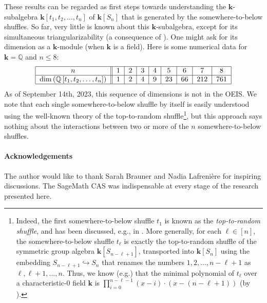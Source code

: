 \documentclass[numbers=enddot,12pt,final,onecolumn,notitlepage]{scrartcl}%
\theoremstyle{definition}
\let\prodnonlimits\prod
\renewcommand{\prod}{\prodnonlimits\limits}
\begin{document}
These results can be regarded as first steps towards understanding the
$\mathbf{k}$-subalgebra $\mathbf{k}\left[  t_{1},t_{2},\ldots,t_{n}\right]  $
of $\mathbf{k}\left[  S_{n}\right]  $ that is generated by the
somewhere-to-below shuffles. So far, very little is known about this
$\mathbf{k}$-subalgebra, except for its simultaneous triangularizability (a
consequence of \cite[Theorem 4.1]{s2b1}). One might ask for its dimension as a
$\mathbf{k}$-module (when $\mathbf{k}$ is a field). Here is some numerical
data for $\mathbf{k}=\mathbb{Q}$ and $n\leq8$:
\begin{equation}%
\begin{tabular}
[c]{|c||c|c|c|c|c|c|c|c|}\hline
$n$ & $1$ & $2$ & $3$ & $4$ & $5$ & $6$ & $7$ & $8$\\\hline
$\dim\left(  \mathbb{Q}\left[  t_{1},t_{2},\ldots,t_{n}\right]  \right)  $ &
$1$ & $2$ & $4$ & $9$ & $23$ & $66$ & $212$ & $761$\\\hline
\end{tabular}
\label{eq.dimQ}%
\end{equation}
As of September 14th, 2023, this sequence of dimensions is not in the OEIS. We
note that each single somewhere-to-below shuffle by itself is easily
understood using the well-known theory of the top-to-random
shuffle\footnote{Indeed, the first somewhere-to-below shuffle $t_{1}$ is known
as the \emph{top-to-random shuffle}, and has been discussed, e.g., in
\cite{Hendri72, Donnel91, Phatar91, Fill96, BiHaRo99, DiFiPi92, Palmes10,
Grinbe18}. More generally, for each $\ell\in\left[  n\right]  $, the
somewhere-to-below shuffle $t_{\ell}$ is exactly the top-to-random shuffle of
the symmetric group algebra $\mathbf{k}\left[  S_{n-\ell+1}\right]  $,
transported into $\mathbf{k}\left[  S_{n}\right]  $ using the embedding
$S_{n-\ell+1}\hookrightarrow S_{n}$ that renames the numbers $1,2,\ldots
,n-\ell+1$ as $\ell,\ell+1,\ldots,n$. Thus, we know (e.g.) that the minimal
polynomial of $t_{\ell}$ over a characteristic-$0$ field $\mathbf{k}$ is
$\prod_{i=0}^{n-\ell-1}\left(  x-i\right)  \cdot\left(  x-\left(
n-\ell+1\right)  \right)  $ (by \cite[Theorem 4.1]{DiFiPi92}).}, but this
approach says nothing about the interactions between two or more of the $n$
somewhere-to-below shuffles.

\paragraph{Acknowledgements}

The author would like to thank Sarah Brauner and Nadia Lafreni\`{e}re for
inspiring discussions. The SageMath CAS \cite{sagemath} was indispensable at
every stage of the research presented here.
\end{document}
